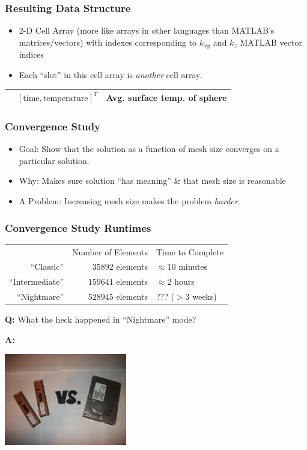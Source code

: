 \documentclass{beamer}
\begin{document}
\begin{frame}
\frametitle{Resulting Data Structure}
\begin{itemize}
\item 2-D Cell Array (more like arrays in other languages than MATLAB's matrices/vectors) with indexes corresponding to \(k_{xy}\) and \(k_z\) MATLAB vector indices
\item Each ``slot'' in this cell array is \emph{another} cell array.
\end{itemize}
\begin{table}
\begin{tabular}{| c | c | c |}
\hline
  & \( \left[ \textrm{time}, \textrm{temperature} \right]^T\) & Avg. surface temp. of sphere\\
\hline
\end{tabular}
\end{table}
\end{frame}


\begin{frame}
\frametitle{Convergence Study}
\begin{itemize}
\item Goal: Show that the solution as a function of mesh size converges on a particular solution.
\item Why: Makes sure solution ``has meaning'' \& that mesh size is reasonable
\item A Problem: Increasing mesh size makes the problem \emph{harder}.
\end{itemize}
\end{frame}


\begin{frame}
\frametitle{Convergence Study Runtimes}
    \begin{table}
    \begin{tabular}{r | r | l}
     & Number of Elements & Time to Complete\\
    ``Classic'' & \(35892\) elements & \(\approx 10\) minutes\\
    ``Intermediate'' & \(159641\) elements & \(\approx 2\) hours\\
    ``Nightmare'' & \(528945\) elements & ??? (\(>3\) weeks)\\
    \end{tabular}
    \end{table}
\textbf{Q:} What the heck happened in ``Nightmare'' mode?

\textbf{A:}\\
\begin{center}
\includegraphics[width=0.4\textwidth]{fig/thedisk.jpg}
\end{center}
\end{frame}
\end{document}
